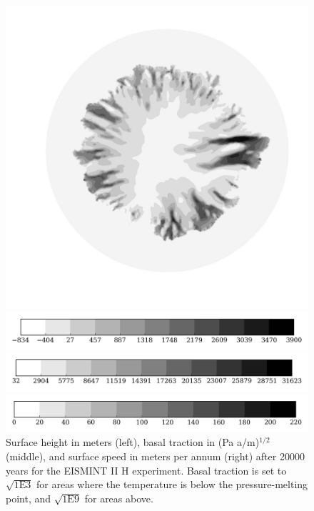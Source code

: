 \begin{figure}
\begin{minipage}[b]{0.30\linewidth}
  \end{minipage}
  \quad
  \begin{minipage}[b]{0.30\linewidth}
    \includegraphics[width=1.0\textwidth]{images/EISMINT_II/H/U_mag_20000.jpg}
  \end{minipage}
  
  \begin{minipage}[b]{0.30\linewidth}
    \includegraphics[width=1.0\textwidth]{images/EISMINT_II/H/S_cb.jpg}
  \end{minipage}
  \quad
  \begin{minipage}[b]{0.30\linewidth}
    \includegraphics[width=1.0\textwidth]{images/EISMINT_II/H/beta_cb.jpg}
  \end{minipage}
  \quad
  \begin{minipage}[b]{0.30\linewidth}
    \includegraphics[width=1.0\textwidth]{images/EISMINT_II/H/U_mag_cb.jpg}
  \end{minipage}
  \caption[]{Surface height in meters (left), basal traction in (Pa a/m)$^{1/2}$ (middle), and surface speed in meters per annum (right) after 20000 years for the EISMINT II H experiment.  Basal traction is set to $\sqrt{1\mathrm{E}3}$ for areas where the temperature is below the pressure-melting point, and $\sqrt{1\mathrm{E}9}$ for areas above.}
\end{figure}
